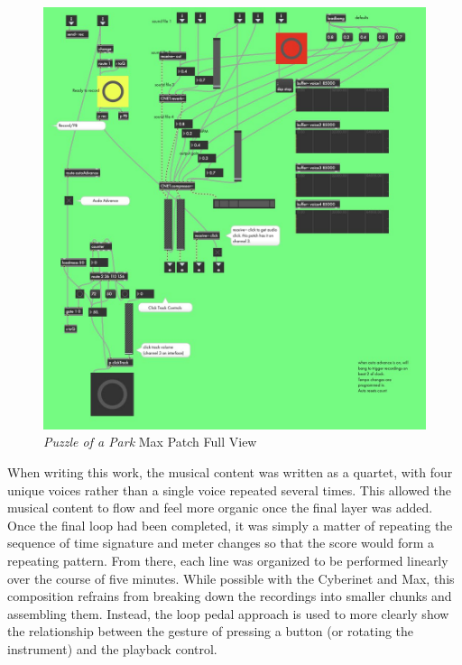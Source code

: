 \begin{figure}
    \centering
    \includegraphics[scale=0.25]{diagrams/maxPatches/puzzleRaw.jpg}
    \caption{\textit{Puzzle of a Park} Max Patch Full View}
    \label{fig:puzzlePatchRaw}
\end{figure}


When writing this work, the musical content was written as a quartet, with four unique voices rather than a single voice repeated several times. This allowed the musical content to flow and feel more organic once the final layer was added. Once the final loop had been completed, it was simply a matter of repeating the sequence of time signature and meter changes so that the score would form a repeating pattern. From there, each line was organized to be performed linearly over the course of five minutes. While possible with the Cyberinet and Max, this composition refrains from breaking down the recordings into smaller chunks and assembling them. Instead, the loop pedal approach is used to more clearly show the relationship between the gesture of pressing a button (or rotating the instrument) and the playback control.

